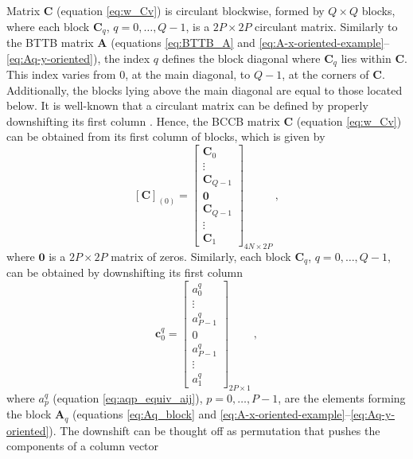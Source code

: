 Matrix $\mathbf{C}$ (equation \ref{eq:w_Cv})
is circulant blockwise, formed by $Q \times Q$ blocks, where
each block $\mathbf{C}_{q}$, $q = 0, \dots, Q-1$, is a $2P \times 2P$ circulant matrix. 
Similarly to the BTTB matrix $\mathbf{A}$ (equations \ref{eq:BTTB_A} and 
\ref{eq:A-x-oriented-example}--\ref{eq:Aq-y-oriented}), 
the index $q$ defines the block diagonal where $\mathbf{C}_{q}$ lies 
within $\mathbf{C}$. This index varies from $0$, at the main diagonal, to $Q - 1$, at
the corners of $\mathbf{C}$. Additionally, the blocks lying 
above the main diagonal are equal to those located below.
It is well-known that a circulant matrix can be defined by properly downshifting 
its first column \citep[][ p. 206]{vanloan1992}. Hence, the BCCB matrix $\mathbf{C}$ 
(equation \ref{eq:w_Cv}) can be obtained from its 
first column of blocks, which is given by
\begin{equation}
\left[\mathbf{C} \right]_{(0)} = 
	\begin{bmatrix}
	\mathbf{C}_{0} \\
	\vdots \\
	\mathbf{C}_{Q-1} \\
	\mathbf{0} \\
	\mathbf{C}_{Q-1} \\
	\vdots \\
	\mathbf{C}_{1}
	\end{bmatrix}_{4N \times 2P} \: ,
	\label{eq:C-first-column-blocks}
\end{equation}
where $\mathbf{0}$ is a $2P \times 2P$ matrix of zeros. Similarly, each block 
$\mathbf{C}_{q}$, $q = 0, \dots, Q-1$, can be obtained by downshifting its first 
column
\begin{equation}
\mathbf{c}^{q}_{0} = 
	\begin{bmatrix}
		a^{q}_{0} \\
		\vdots \\
		a^{q}_{P-1} \\
		0 \\
		a^{q}_{P-1} \\
		\vdots \\
		a^{q}_{1}
	\end{bmatrix}_{2P \times 1} \: ,
	\label{eq:Cq-first-column}
\end{equation}
where $a^{q}_{p}$ (equation \ref{eq:aqp_equiv_aij}), $p = 0, \dots, P-1$, are the elements 
forming the block $\mathbf{A}_{q}$ (equations \ref{eq:Aq_block} and 
\ref{eq:A-x-oriented-example}--\ref{eq:Aq-y-oriented}).
The downshift can be thought off as permutation that pushes the components of a column vector 
